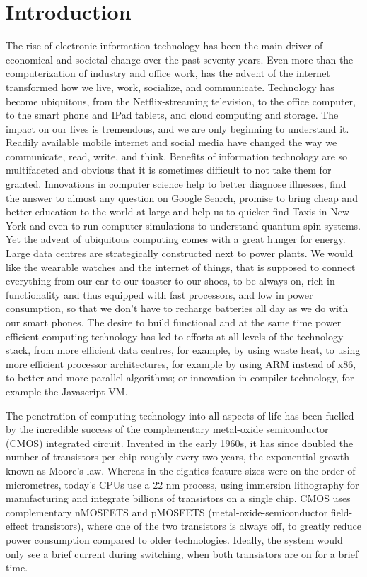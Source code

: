 \chapter{Introduction}

The rise of electronic information technology has been the main driver of
economical and societal change over the past seventy years. Even more than the
computerization of industry and office work, has the advent of the internet
transformed how we live, work, socialize, and communicate. Technology has become
ubiquitous, from the Netflix-streaming television, to the office computer, to
the smart phone and IPad tablets, and cloud computing and storage. The impact on
our lives is tremendous, and we are only beginning to understand it. Readily
available mobile internet and social media have changed the way we communicate,
read, write, and think. Benefits of information technology are so multifaceted
and obvious that it is sometimes difficult to not take them for granted. Innovations in computer science help to better diagnose
illnesses, find the answer to almost any question on Google Search, promise to
bring cheap and better education to the world at large and help us to quicker
find Taxis in New York and even to run computer simulations to understand
quantum spin systems. Yet the advent of ubiquitous computing comes with a great
hunger for energy. Large data centres are strategically constructed next to
power plants. We would like the wearable watches and the internet of things,
that is supposed to connect everything from our car to our toaster to our shoes,
to be always on, rich in functionality and thus equipped with fast processors,
and low in power consumption, so that we don't have to recharge batteries all
day as we do with our smart phones. The desire to build functional and at the
same time power efficient computing technology has led to efforts at all levels
of the technology stack, from more efficient data centres, for example, by using
waste heat, to using more efficient processor architectures, for example by
using ARM instead of x86, to better and more parallel algorithms; or innovation
in compiler technology, for example the Javascript VM.

The penetration of computing technology into all aspects of life has been
fuelled by the incredible success of the complementary metal-oxide semiconductor
(CMOS) integrated circuit. Invented in the early 1960s, it has since doubled the
number of transistors per chip roughly every two years, the exponential growth
known as Moore's law. Whereas in the eighties feature sizes were on the order of
micrometres, today's CPUs use a 22 nm process, using immersion lithography for
manufacturing and integrate billions of transistors on a single chip. CMOS uses
complementary nMOSFETS and pMOSFETS (metal-oxide-semiconductor field-effect
transistors), where one of the two transistors is always off, to greatly reduce
power consumption compared to older technologies. Ideally, the system would only
see a brief current during switching, when both transistors are on for a brief
time.


